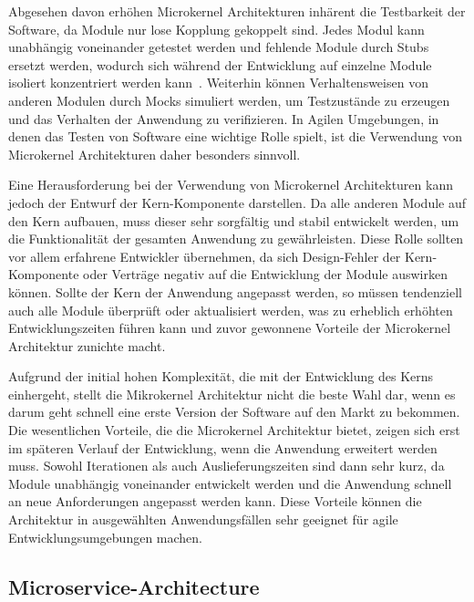 \documentclass[acmtog]{acmart}
\begin{document}
Abgesehen davon erhöhen Microkernel Architekturen inhärent die Testbarkeit der Software, da Module nur lose Kopplung gekoppelt sind.
Jedes Modul kann unabhängig voneinander getestet werden und fehlende Module durch Stubs ersetzt werden, wodurch sich während der Entwicklung auf einzelne Module isoliert konzentriert werden kann~\cite[26]{architecturePatterns}.
Weiterhin können Verhaltensweisen von anderen Modulen durch Mocks simuliert werden, um Testzustände zu erzeugen und das Verhalten der Anwendung zu verifizieren.
In Agilen Umgebungen, in denen das Testen von Software eine wichtige Rolle spielt, ist die Verwendung von Microkernel Architekturen daher besonders sinnvoll.

Eine Herausforderung bei der Verwendung von Microkernel Architekturen kann jedoch der Entwurf der Kern-Komponente darstellen.
Da alle anderen Module auf den Kern aufbauen, muss dieser sehr sorgfältig und stabil entwickelt werden, um die Funktionalität der gesamten Anwendung zu gewährleisten.
Diese Rolle sollten vor allem erfahrene Entwickler übernehmen, da sich Design-Fehler der Kern-Komponente oder Verträge negativ auf die Entwicklung der Module auswirken können.
Sollte der Kern der Anwendung angepasst werden, so müssen tendenziell auch alle Module überprüft oder aktualisiert werden, was zu erheblich erhöhten Entwicklungszeiten führen kann und zuvor gewonnene Vorteile der Microkernel Architektur zunichte macht.

Aufgrund der initial hohen Komplexität, die mit der Entwicklung des Kerns einhergeht, stellt die Mikrokernel Architektur nicht die beste Wahl dar, wenn es darum geht schnell eine erste Version der Software auf den Markt zu bekommen.
Die wesentlichen Vorteile, die die Microkernel Architektur bietet, zeigen sich erst im späteren Verlauf der Entwicklung, wenn die Anwendung erweitert werden muss.
Sowohl Iterationen als auch Auslieferungszeiten sind dann sehr kurz, da Module unabhängig voneinander entwickelt werden und die Anwendung schnell an neue Anforderungen angepasst werden kann.
Diese Vorteile können die Architektur in ausgewählten Anwendungsfällen sehr geeignet für agile Entwicklungsumgebungen machen.

\subsection{Microservice-Architecture}
\label{subsec:microservice}
\end{document}
